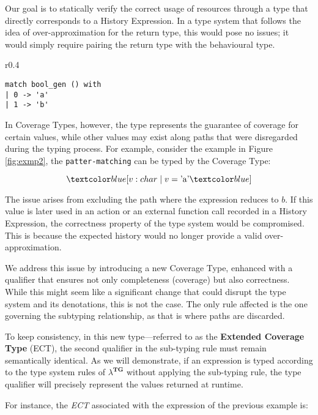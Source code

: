 Our goal is to statically verify the correct usage of resources through a type that directly corresponds to a History Expression. In a type system that follows the idea of over-approximation for the return type, this would pose no issues; it would simply require pairing the return type with the behavioural type.

\begin{wrapfigure}{r}{0.4\textwidth}
    \centering
    \begin{lstlisting}
match bool_gen () with
| 0 -> 'a'
| 1 -> 'b'
    \end{lstlisting}
    \caption{}
    \label{fig:exmp2}
\end{wrapfigure}

In Coverage Types, however, the type represents the guarantee of coverage for certain values, while other values may exist along paths that were disregarded during the typing process. For example, consider the example in Figure \ref{fig:exmp2}, the \verb|patter-matching| can be typed by the Coverage Type:

\begin{equation}
    \under{v: char \;|\; v = \text{'a'}}
\end{equation}

The issue arises from excluding the path where the expression reduces to $b$. If this value is later used in an action or an external function call recorded in a History Expression, the correctness property of the type system would be compromised. This is because the expected history would no longer provide a valid over-approximation.

We address this issue by introducing a new Coverage Type, enhanced with a qualifier that ensures not only completeness (coverage) but also correctness. While this might seem like a significant change that could disrupt the type system and its denotations, this is not the case. The only rule affected is the one governing the subtyping relationship, as that is where paths are discarded.

To keep consistency, in this new type—referred to as the \textbf{Extended Coverage Type} (ECT), the second qualifier in the sub-typing rule must remain semantically identical. As we will demonstrate, if an expression is typed according to the type system rules of $\lambda^{\textbf{TG}}$ \cite{coverage} without applying the sub-typing rule, the type qualifier will precisely represent the values returned at runtime.

For instance, the \emph{ECT} associated with the expression of the previous example is:

